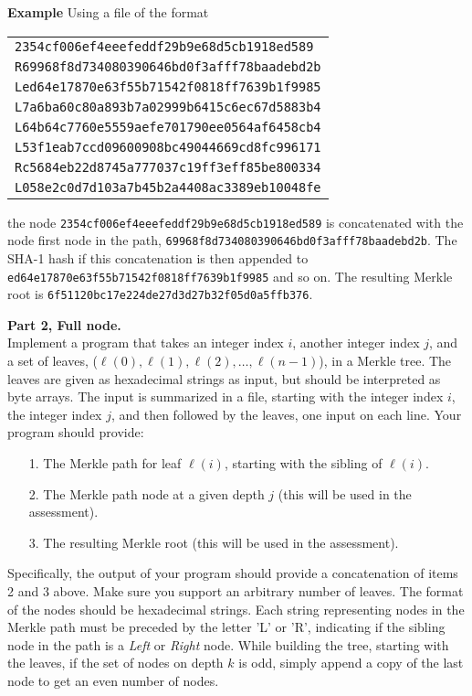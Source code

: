 \documentclass{article}
\begin{document}
\begin{description}
		{\bf Example} Using a file of the format
		\begin{center}
			\begin{tabular}{l}
				\texttt{2354cf006ef4eeefeddf29b9e68d5cb1918ed589}\\
				\texttt{R69968f8d734080390646bd0f3afff78baadebd2b}\\
				\texttt{Led64e17870e63f55b71542f0818ff7639b1f9985}\\
				\texttt{L7a6ba60c80a893b7a02999b6415c6ec67d5883b4}\\
				\texttt{L64b64c7760e5559aefe701790ee0564af6458cb4}\\
				\texttt{L53f1eab7ccd09600908bc49044669cd8fc996171}\\
				\texttt{Rc5684eb22d8745a777037c19ff3eff85be800334}\\
				\texttt{L058e2c0d7d103a7b45b2a4408ac3389eb10048fe}
			\end{tabular}
		\end{center}
		the node \texttt{2354cf006ef4eeefeddf29b9e68d5cb1918ed589} is concatenated with the node first node in the path, \texttt{69968f8d734080390646bd0f3afff78baadebd2b}. The SHA-1 hash if this concatenation is then appended to \texttt{ed64e17870e63f55b71542f0818ff7639b1f9985} and so on. The resulting Merkle root is \texttt{6f51120bc17e224de27d3d27b32f05d0a5ffb376}.
		
		
		{\bf Part 2, Full node.}\\ Implement a program that takes an integer index $i$, another integer index $j$, and a set of leaves, ($\ell(0),\ell(1),\ell(2),\ldots,\ell(n-1)$), in a Merkle tree. The leaves are given as hexadecimal strings as input, but should be interpreted as byte arrays. The input is summarized in a file, starting with the integer index $i$, the integer index $j$, and then followed by the leaves, one input on each line. Your program should provide: 
		\begin{itemize}
			\item[1.] The Merkle path for leaf $\ell(i)$, starting with the sibling of $\ell(i)$.
			\item[2.] The Merkle path node at a given depth $j$ (this will be used in the assessment). 
			\item[3.] The resulting Merkle root (this will be used in the assessment).
		\end{itemize}
		Specifically, the output of your program should provide a concatenation of items 2 and 3 above. Make sure you support an arbitrary number of leaves. The format of the nodes should be hexadecimal strings. Each string representing nodes in the Merkle path must be preceded by the letter 'L' or 'R', indicating if the sibling node in the path is a \textit{Left} or \textit{Right} node. While building the tree, starting with the leaves, if the set of nodes on depth $k$ is odd, simply append a copy of the last node to get an even number of nodes.
		

\end{description}
\end{document}
